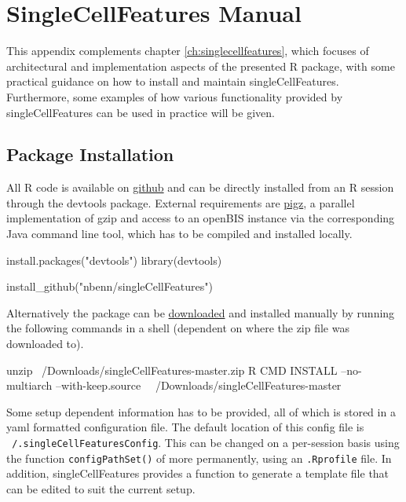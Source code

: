 \chapter{SingleCellFeatures Manual}
\label{ch:scf-manual}

This appendix complements chapter \ref{ch:singlecellfeatures}, which focuses of architectural and implementation aspects of the presented R package, with some practical guidance on how to install and maintain singleCellFeatures. Furthermore, some examples of how various functionality provided by singleCellFeatures can be used in practice will be given.

\section{Package Installation}
\label{sec:install-package}
All R code is available on \href{https://github.com/nbenn/singleCellFeatures}{github} and can be directly installed from an R session through the devtools package. External requirements are \href{http://zlib.net/pigz/}{pigz}, a parallel implementation of gzip and access to an openBIS \citep{Bauch2011} instance via the corresponding Java command line tool, which has to be compiled and installed locally.

\begin{rflow}
install.packages("devtools")
library(devtools)

install_github("nbenn/singleCellFeatures")
\end{rflow}

Alternatively the package can be \href{https://github.com/nbenn/singleCellFeatures/archive/master.zip}{downloaded} and installed manually by running the following commands in a shell (dependent on where the zip file was downloaded to).

\begin{bashflow}
unzip ~/Downloads/singleCellFeatures-master.zip
R CMD INSTALL --no-multiarch --with-keep.source \
  ~/Downloads/singleCellFeatures-master
\end{bashflow}

Some setup dependent information has to be provided, all of which is stored in a yaml formatted configuration file. The default location of this config file is \texttt{~/.singleCellFeaturesConfig}. This can be changed on a per-session basis using the function \texttt{configPathSet()} of more permanently, using an \texttt{.Rprofile} file. In addition, singleCellFeatures provides a function to generate a template file that can be edited to suit the current setup.

